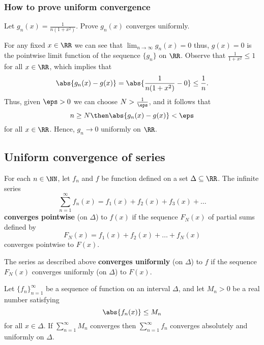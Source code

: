 \documentclass[12pt, a4paper]{article}
\begin{document}
\subsubsection{How to prove uniform convergence}

\begin{mdexample}
    Let \(g_n(x) = \frac{1}{n(1+x^2)}\). Prove \(g_n(x)\) converges uniformly.
    \begin{solution}
        For any fixed \(x \in \RR\) we can see that \(\lim_{n \to \infty} g_n(x)=0\) thus, \(g(x)=0\) is the pointwise limit function of the sequence \(\{g_n\}\) on \(\RR\). Observe that \(\frac{1}{1+x^2} \leq 1\) for all \(x\in \RR\), which implies that 
        \[\abs{g_n(x)-g(x)}=\abs{\frac{1}{n(1+x^2)}-0} \leq \frac{1}{n}.\]
        Thus, given \(\eps>0\) we can choose \(N > \frac{1}{\eps}\), and it follows that 
        \[n \geq N \then \abs{g_n(x)-g(x)}<\eps\]
        for all \(x \in \RR\). Hence, \(g_n \to 0\) uniformly on \(\RR\).
    \end{solution}
\end{mdexample}

\subsection{Uniform convergence of series}

\begin{definition}
    For each \(n\in \NN\), let \(f_n\) and \(f\) be function defined on a set \(\Delta \subseteq \RR\). The infinite series 
    \[\sum_{n=1}^{\infty} f_n(x)=f_1(x)+f_2(x)+f_3(x)+\ldots\]
    \textbf{converges pointwise} (on \(\Delta\)) to \(f(x)\) if the sequence \(F_N(x)\) of partial sums defined by 
    \[F_N(x)=f_1(x)+f_2(x)+ \ldots +f_N(x)\]
    converges pointwise to \(F(x)\).
\end{definition}

\begin{definition}
    The series as described above \textbf{converges uniformly} (on \(\Delta\)) to \(f\) if the sequence \(F_N(x)\) converges uniformly (on \(\Delta\)) to \(F(x)\).
\end{definition}

\begin{mdthm}
    Let \(\{f_n\}_{n=1}^{\infty}\) be a sequence of function on an interval \(\Delta\), and let \(M_n>0\) be a real number satisfying 
    \[\abs{f_n(x)}\leq M_n\]
    for all \(x \in \Delta\). If \(\sum_{n=1}^{\infty} M_n\) converges then \(\sum_{n=1}^{\infty} f_n\) converges absolutely and uniformly on \(\Delta\).
\end{mdthm}
\end{document}
